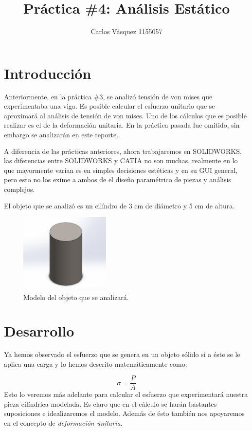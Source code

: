 \documentclass[12pt, letterpaper]{article}
\title{Práctica \#4: Análisis Estático}
\author{Carlos Vásquez 1155057}
\begin{document}
\maketitle
\section*{Introducción}

Anteriormente, en la práctica \#3, se analizó tensión de von mises que experimentaba una viga. Es posible calcular el esfuerzo unitario que se aproximará al análisis de tensión de von mises. Uno de los cálculos que es posible realizar es el de la deformación unitaria. En la práctica pasada fue omitido, sin embargo se analizarán en este reporte.

A diferencia de las prácticas anteriores, ahora trabajaremos en SOLIDWORKS, las diferencias entre SOLIDWORKS y CATIA no son muchas, realmente en lo que mayormente varían es en simples decisiones estéticas y en su GUI general, pero esto no los exime a ambos de el diseño paramétrico de piezas y análisis complejos.

El objeto que se analizó es un cilíndro de 3 cm de diámetro y 5 cm de altura.

\begin{figure}[H]
	\centering
	\includegraphics[width=0.4\textwidth]{cilinder.png}
	\caption{Modelo del objeto que se analizará.}
\end{figure}

\section*{Desarrollo}
Ya hemos observado el esfuerzo que se genera en un objeto sólido si a éste se le aplica una carga y lo hemos descrito matemáticamente como:

\begin{equation}
	\sigma = \frac{P}{A}
\end{equation}
Esto lo veremos más adelante para calcular el esfuerzo que experimentará nuestra pieza cilíndrica modelada. Es claro que en el cálculo se harán bastantes suposiciones e idealizaremos el modelo. Además de ésto también nos apoyaremos en el concepto de \textit{deformación unitaria}.
\end{document}
